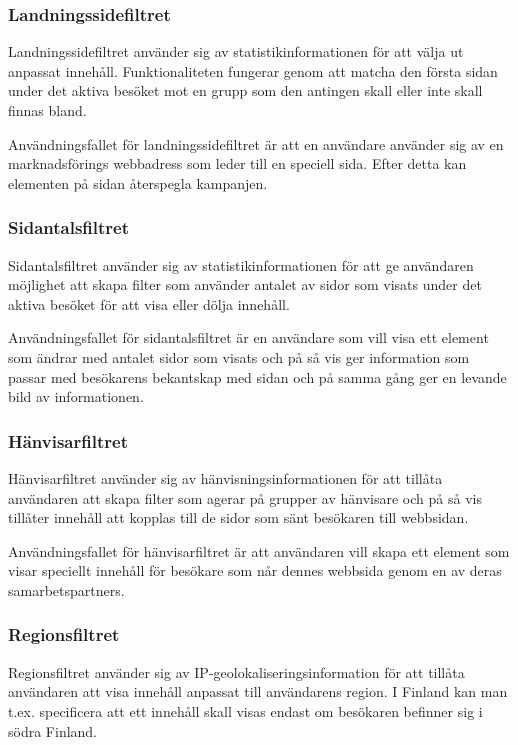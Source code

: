 \subsubsection{Landningssidefiltret}

Landningssidefiltret använder sig av statistikinformationen för att välja ut anpassat innehåll. Funktionaliteten fungerar genom att matcha den första sidan under det aktiva besöket mot en grupp som den antingen skall eller inte skall finnas bland.

Användningsfallet för landningssidefiltret är att en användare använder sig av en marknadsförings webbadress som leder till en speciell sida. Efter detta kan elementen på sidan återspegla kampanjen.

\subsubsection{Sidantalsfiltret}

Sidantalsfiltret använder sig av statistikinformationen för att ge användaren möjlighet att skapa filter som använder antalet av sidor som visats under det aktiva besöket för att visa eller dölja innehåll.

Användningsfallet för sidantalsfiltret är en användare som vill visa ett element som ändrar med antalet sidor som visats och på så vis ger information som passar med besökarens bekantskap med sidan och på samma gång ger en levande bild av informationen.

\subsubsection{Hänvisarfiltret}

Hänvisarfiltret använder sig av hänvisningsinformationen för att tillåta användaren att skapa filter som agerar på grupper av hänvisare och på så vis tillåter innehåll att kopplas till de sidor som sänt besökaren till webbsidan.

Användningsfallet för hänvisarfiltret är att användaren vill skapa ett element som visar speciellt innehåll för besökare som når dennes webbsida genom en av deras samarbetspartners.

\subsubsection{Regionsfiltret}

Regionsfiltret använder sig av IP-geolokaliseringsinformation för att tillåta användaren att visa innehåll anpassat till användarens region. I Finland kan man t.ex. specificera att ett innehåll skall visas endast om besökaren befinner sig i södra Finland.

